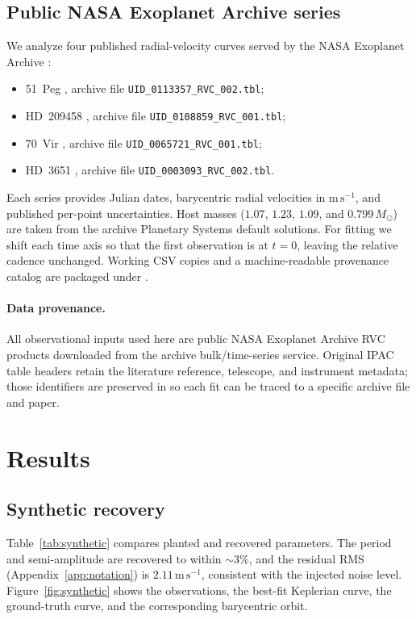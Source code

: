 \documentclass[11pt]{article}
\begin{document}
\subsection{Public NASA Exoplanet Archive series}

We analyze four published radial-velocity curves served by the NASA Exoplanet
Archive \citep{christiansen2025nea}:
\begin{itemize}
  \item 51~Peg \citep{marcy1997peg}, archive file
    \texttt{UID\_0113357\_RVC\_002.tbl};
  \item HD~209458 \citep{butler2006catalog}, archive file
    \texttt{UID\_0108859\_RVC\_001.tbl};
  \item 70~Vir \citep{butler2006catalog,marcy1996planet}, archive file
    \texttt{UID\_0065721\_RVC\_001.tbl};
  \item HD~3651 \citep{butler2006catalog}, archive file
    \texttt{UID\_0003093\_RVC\_002.tbl}.
\end{itemize}
Each series provides Julian dates, barycentric radial velocities in
$\mathrm{m\,s^{-1}}$, and published per-point uncertainties. Host masses
($1.07$, $1.23$, $1.09$, and $0.799\,M_\odot$) are taken from the archive
Planetary Systems default solutions. For fitting we shift each time axis so
that the first observation is at $t=0$, leaving the relative cadence unchanged.
Working CSV copies and a machine-readable provenance catalog are packaged under
.

\paragraph{Data provenance.}
All observational inputs used here are public NASA Exoplanet Archive RVC
products downloaded from the archive bulk/time-series service. Original IPAC
table headers retain the literature reference, telescope, and instrument
metadata; those identifiers are preserved in  so each fit
can be traced to a specific archive file and paper.

\section{Results}

\subsection{Synthetic recovery}

Table~\ref{tab:synthetic} compares planted and recovered parameters. The
period and semi-amplitude are recovered to within $\sim 3\%$, and the residual
RMS (Appendix~\ref{app:notation}) is $2.11\,\mathrm{m\,s^{-1}}$, consistent
with the injected noise level.
Figure~\ref{fig:synthetic} shows the observations, the best-fit Keplerian
curve, the ground-truth curve, and the corresponding barycentric orbit.
\end{document}
